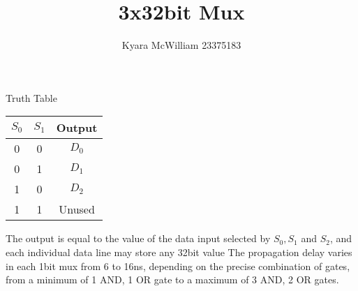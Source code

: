 \documentclass{article}
\title{3x32bit Mux}
\author{Kyara McWilliam 23375183}
\date{}
\begin{document}
\maketitle

Truth Table


\begin{tabular}{ |c|c|c| }
\hline
$S_0$ & $S_1$ & Output \\
\hline
0 & 0 & $D_0$ \\
0 & 1 & $D_1$ \\
1 & 0 & $D_2$ \\ 
1 & 1 & Unused \\
\hline
\end{tabular}

\hfill \break

The output is equal to the value of the data input selected by $S_0, S_1$ and $S_2$, and each individual data line may store any 32bit value \newline
The propagation delay varies in each 1bit mux from 6 to 16ns, depending on the precise combination of gates, from a minimum of 1 AND, 1 OR gate to a maximum of 3 AND, 2 OR gates.
\end{document}
